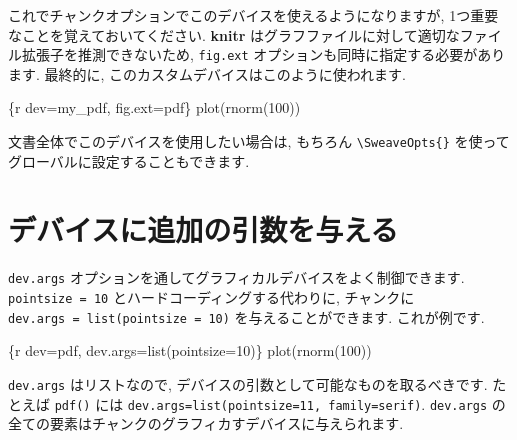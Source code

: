 \documentclass[
  xelatex,ja=standard,jafont=noto]{bxjsreport}
\newenvironment{Shaded}{\begin{snugshade}}{\end{snugshade}}
\newcommand{\AttributeTok}[1]{\textcolor[rgb]{0.77,0.63,0.00}{#1}}
\newcommand{\StringTok}[1]{\textcolor[rgb]{0.31,0.60,0.02}{#1}}
\begin{document}
これでチャンクオプションでこのデバイスを使えるようになりますが,
1つ重要なことを覚えておいてください. \textbf{knitr}
はグラフファイルに対して適切なファイル拡張子を推測できないため,
\texttt{fig.ext} オプションも同時に指定する必要があります. 最終的に,
このカスタムデバイスはこのように使われます.

\begin{Shaded}
\begin{Highlighting}[]
\StringTok{\textasciigrave{}\textasciigrave{}\textasciigrave{}}\AttributeTok{\{r dev=\textquotesingle{}my\_pdf\textquotesingle{}, fig.ext=\textquotesingle{}pdf\textquotesingle{}\}}
\AttributeTok{plot(rnorm(100))}
\StringTok{\textasciigrave{}\textasciigrave{}\textasciigrave{}}
\end{Highlighting}
\end{Shaded}

文書全体でこのデバイスを使用したい場合は, もちろん
\texttt{\textbackslash{}SweaveOpts\{\}}
を使ってグローバルに設定することもできます.

\hypertarget{ux30c7ux30d0ux30a4ux30b9ux306bux8ffdux52a0ux306eux5f15ux6570ux3092ux4e0eux3048ux308b}{%
\section*{デバイスに追加の引数を与える}\label{ux30c7ux30d0ux30a4ux30b9ux306bux8ffdux52a0ux306eux5f15ux6570ux3092ux4e0eux3048ux308b}}

\texttt{dev.args}
オプションを通してグラフィカルデバイスをよく制御できます.
\texttt{pointsize\ =\ 10} とハードコーディングする代わりに, チャンクに
\texttt{dev.args\ =\ list(pointsize\ =\ 10)} を与えることができます.
これが例です.

\begin{Shaded}
\begin{Highlighting}[]
\StringTok{\textasciigrave{}\textasciigrave{}\textasciigrave{}}\AttributeTok{\{r dev=\textquotesingle{}pdf\textquotesingle{}, dev.args=list(pointsize=10)\}}
\AttributeTok{plot(rnorm(100))}
\StringTok{\textasciigrave{}\textasciigrave{}\textasciigrave{}}
\end{Highlighting}
\end{Shaded}

\texttt{dev.args} はリストなので,
デバイスの引数として可能なものを取るべきです. たとえば \texttt{pdf()}
には
\texttt{dev.args=list(pointsize=11,\ family=\textquotesingle{}serif\textquotesingle{})}.
\texttt{dev.args}
の全ての要素はチャンクのグラフィカすデバイスに与えられます.
\end{document}
